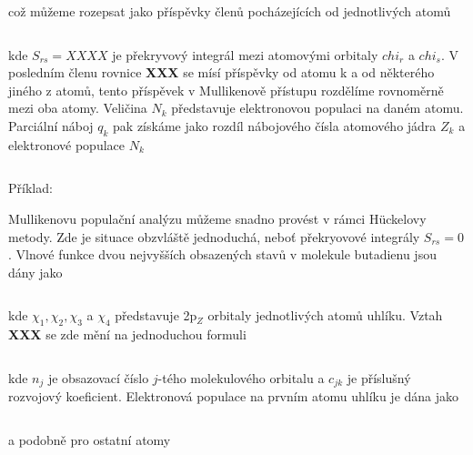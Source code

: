 \begin{equation}
\label{rov:XXX}
\end{equation}

\noindent což můžeme rozepsat jako příspěvky členů pocházejících od jednotlivých atomů

\begin{equation}
\label{rov:XXX}
\end{equation}

\noindent kde $S_{rs}=XXXX$ je překryvový integrál mezi atomovými orbitaly $chi_r$ a $chi_s$. V posledním členu rovnice \textbf{XXX} se mísí příspěvky od atomu k a od některého jiného z atomů, tento příspěvek v Mullikenově přístupu rozdělíme rovnoměrně mezi oba atomy. Veličina $N_k$ představuje elektronovou populaci na daném atomu. Parciální náboj $q_k$ pak získáme jako rozdíl nábojového čísla atomového jádra $Z_k$ a elektronové populace $N_k$

\begin{equation}
\label{rov:XXX}
\end{equation}


Příklad:


Mullikenovu populační analýzu můžeme snadno provést v rámci H\"uckelovy metody. Zde je situace obzvláště jednoduchá, neboť překryovové integrály $S_{rs}=0$. Vlnové funkce dvou nejvyšších obsazených stavů v molekule butadienu jsou dány jako


\begin{equation}
\label{rov:XXX}
\end{equation}

 
\noindent kde $\chi_1,\chi_2, \chi_3$ a $\chi_4$ představuje 2p$_Z$ orbitaly jednotlivých atomů uhlíku. Vztah \textbf{XXX} se zde mění na jednoduchou formuli

\begin{equation}
\label{rov:XXX}
\end{equation}

\noindent kde $n_j$ je obsazovací číslo $j$-tého molekulového orbitalu a $c_{jk}$ je příslušný rozvojový koeficient. Elektronová populace na prvním atomu uhlíku je dána jako

\begin{equation}
\label{rov:XXX}
\end{equation}


\noindent a podobně pro ostatní atomy


\begin{equation}
\label{rov:XXX}
\end{equation}


